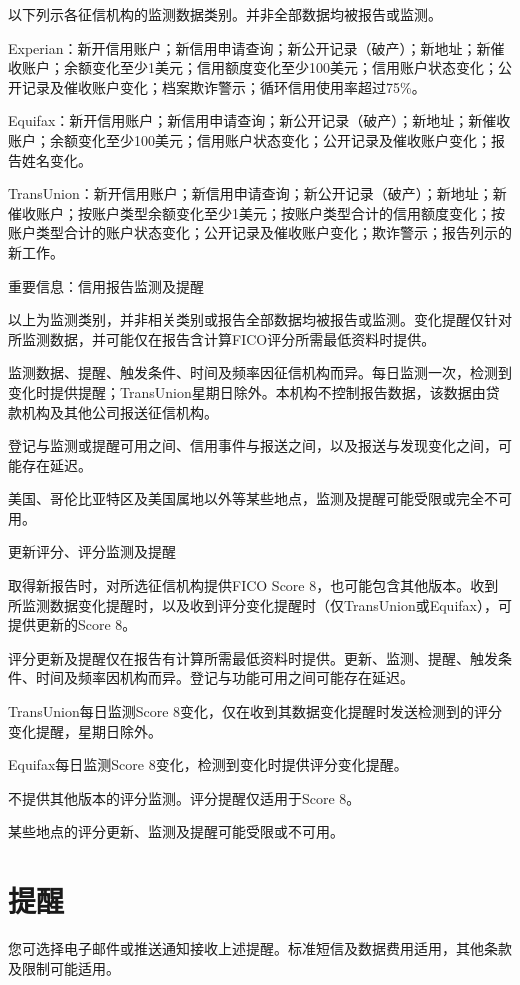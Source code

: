 \documentclass[UTF8,fontset=none,11pt,a4paper]{ctexart}
\begin{document}
以下列示各征信机构的监测数据类别。并非全部数据均被报告或监测。


Experian：新开信用账户；新信用申请查询；新公开记录（破产）；新地址；新催收账户；余额变化至少1美元；信用额度变化至少100美元；信用账户状态变化；公开记录及催收账户变化；档案欺诈警示；循环信用使用率超过75\%。


Equifax：新开信用账户；新信用申请查询；新公开记录（破产）；新地址；新催收账户；余额变化至少100美元；信用账户状态变化；公开记录及催收账户变化；报告姓名变化。


TransUnion：新开信用账户；新信用申请查询；新公开记录（破产）；新地址；新催收账户；按账户类型余额变化至少1美元；按账户类型合计的信用额度变化；按账户类型合计的账户状态变化；公开记录及催收账户变化；欺诈警示；报告列示的新工作。


重要信息：信用报告监测及提醒


以上为监测类别，并非相关类别或报告全部数据均被报告或监测。变化提醒仅针对所监测数据，并可能仅在报告含计算FICO评分所需最低资料时提供。


监测数据、提醒、触发条件、时间及频率因征信机构而异。每日监测一次，检测到变化时提供提醒；TransUnion星期日除外。本机构不控制报告数据，该数据由贷款机构及其他公司报送征信机构。


登记与监测或提醒可用之间、信用事件与报送之间，以及报送与发现变化之间，可能存在延迟。


美国、哥伦比亚特区及美国属地以外等某些地点，监测及提醒可能受限或完全不可用。


更新评分、评分监测及提醒


取得新报告时，对所选征信机构提供FICO Score 8，也可能包含其他版本。收到所监测数据变化提醒时，以及收到评分变化提醒时（仅TransUnion或Equifax），可提供更新的Score 8。


评分更新及提醒仅在报告有计算所需最低资料时提供。更新、监测、提醒、触发条件、时间及频率因机构而异。登记与功能可用之间可能存在延迟。


TransUnion每日监测Score 8变化，仅在收到其数据变化提醒时发送检测到的评分变化提醒，星期日除外。


Equifax每日监测Score 8变化，检测到变化时提供评分变化提醒。


不提供其他版本的评分监测。评分提醒仅适用于Score 8。


某些地点的评分更新、监测及提醒可能受限或不可用。


\section*{提醒}
您可选择电子邮件或推送通知接收上述提醒。标准短信及数据费用适用，其他条款及限制可能适用。
\end{document}
